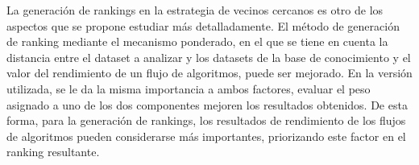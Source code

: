 La generación de rankings en la estrategia de vecinos cercanos es otro de los aspectos que se propone estudiar más detalladamente. El método de generación de ranking mediante el mecanismo ponderado, en el que se tiene en cuenta la distancia entre el dataset a analizar y los datasets de la base de conocimiento y el valor del rendimiento de un flujo de algoritmos, puede ser mejorado. En la versión utilizada, se le da la misma importancia a ambos factores, evaluar el peso asignado a uno de los dos componentes mejoren los resultados obtenidos. De esta forma, para la generación de rankings, los resultados de rendimiento de los flujos de algoritmos pueden considerarse más importantes, priorizando este factor en el ranking resultante.






